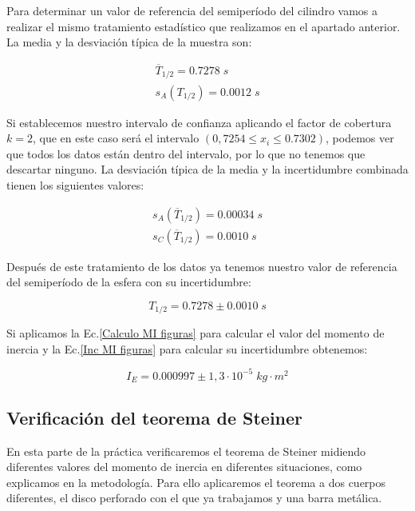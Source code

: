 \documentclass[a4paper,12pt,titlepage]{article}
\begin{document}
Para determinar un valor de referencia del semiperíodo del cilindro vamos a realizar el mismo tratamiento estadístico que realizamos en el apartado anterior. La media y la desviación típica de la muestra son:

\begin{equation}
    \begin{gathered}
        \overline{T}_{1/2} = 0.7278 \; s\\
        s_A(T_{1/2}) = 0.0012 \; s
    \end{gathered}
\end{equation}

Si establecemos nuestro intervalo de confianza aplicando el factor de cobertura $k=2$, que en este caso será el intervalo $(0,7254 \leq x_i \leq 0.7302)$, podemos ver que todos los datos están dentro del intervalo, por lo que no tenemos que descartar ninguno. La desviación típica de la media y la incertidumbre combinada tienen los siguientes valores:

\begin{equation}
    \begin{gathered}
        s_A(\overline{T}_{1/2}) = 0.00034 \; s\\
        s_C(\overline{T}_{1/2}) = 0.0010 \; s
    \end{gathered}
\end{equation}

Después de este tratamiento de los datos ya tenemos nuestro valor de referencia del semiperíodo de la esfera con su incertidumbre:

\begin{equation}
    T_{1/2} = 0.7278 \pm 0.0010 \; s
\end{equation}

Si aplicamos la Ec.\ref{Calculo MI figuras} para calcular el valor del momento de inercia y la Ec.\ref{Inc MI figuras} para calcular su incertidumbre obtenemos:

\begin{equation}
    I_E = 0.000997 \pm  1,3 \cdot 10^{-5} \;kg\cdot m^2
\end{equation}

\subsection{Verificación del teorema de Steiner}

En esta parte de la práctica verificaremos el teorema de Steiner midiendo diferentes valores del momento de inercia en diferentes situaciones, como explicamos en la metodología. Para ello aplicaremos el teorema a dos cuerpos diferentes, el disco perforado con el que ya trabajamos y una barra metálica.
\end{document}
